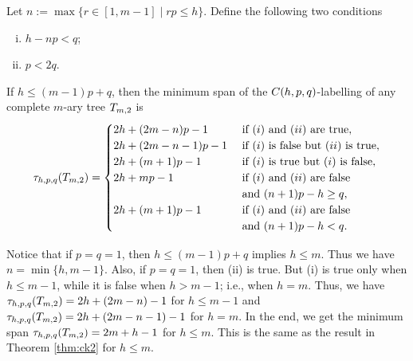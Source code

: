 \begin{theorem}
\label{thm:chpq2}
Let $n := \max\{r \in [1,m-1] \mid rp \le h\}$. Define the following two conditions 
\begin{enumerate}[(i)]
\item $h-np < q$;
\item $p < 2q$.	
\end{enumerate}
If $h \le (m-1)p+q$, then the minimum span of the $C(h,p,q)$-labelling of any complete $m$-ary tree $\tm2$ is 
\begin{align*}
\thpq(\tm2)= 
 \begin{cases}
 2h+(2m-n)p-1 & \text{ if } (i) \text{ and } (ii) \text{ are true}, \\
 2h+(2m-n-1)p-1 & \text{ if } (i) \text{ is false but } (ii) \text{ is true}, \\
 2h+(m+1)p-1 & \text{ if } (i) \text{ is true but } (i) \text{ is false}, \\
 2h+mp-1 & \text{ if } (i) \text{ and } (ii) \text{ are false}\\ &\text{ and } (n+1)p-h \ge q, \\
 2h+(m+1)p-1 & \text{ if } (i) \text{ and } (ii) \text{ are false}\\ &\text{ and } (n+1)p-h < q.
 \end{cases}
\end{align*}
\end{theorem}

Notice that if $p = q = 1$, then $h \le (m-1)p+q$ implies $h \le m$. Thus we have $n = \min\{h, m-1\}$. Also, if $p=q=1$, then (ii) is true. But (i) is true only when $h \le m-1$, while it is false when $h > m-1$; i.e.,  when $h = m$. Thus, we have $\thpq(\tm2) = 2h+(2m-n)-1$ for $h \le m-1$ and $\thpq(\tm2) = 2h+(2m-n-1)-1$ for $h = m$. In the end, we get the minimum span $\thpq(\tm2) = 2m+h-1$ for $ h \le m$. This is the same as the result in Theorem \ref{thm:ck2} for $h \le m$.

